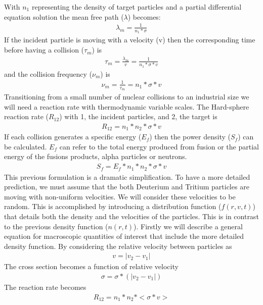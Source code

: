 \documentclass[English]{article}
\begin{document}
With $n_1$ representing the density of target particles and a partial differential equation solution the mean free path ($\lambda$) becomes:
\begin{gather*}\lambda_m = \frac{1}{n_1 * \sigma}\end{gather*}
If the incident particle is moving with a velocity (v) then the corresponding time before having a collision ($\tau_m$) is
\begin{gather*}\tau_m = \frac{\lambda_m}{v}=\frac{1}{n_1 * \sigma * v}\end{gather*}
and the collision frequency ($\nu_m$) is 
\begin{gather*}\nu_m = \frac{1}{\tau_m}=n_1 * \sigma *v\end{gather*}
Transitioning from a small number of nuclear collisions to an industrial size we will need a reaction rate with thermodynamic variable scales. The Hard-sphere reaction rate ($R_{12}$) with 1, the incident particles, and 2, the target is
\begin{gather*}R_{12} = n_1 * n_2 * \sigma * v\end{gather*}
If each collision generates a specific energy ($E_f$) then the power density ($S_f$) can be calculated. $E_f$ can refer to the total energy produced from fusion or the partial energy of the fusions products, alpha particles or neutrons. 
\begin{gather*}S_f = E_f * n_1 * n_2 * \sigma * v\end{gather*}
This previous formulation is a dramatic simplification. To have a more detailed prediction, we must assume that the both Deuterium and Tritium particles are moving with non-uniform velocities. We will consider these velocities to be random. This is accomplished by introducing a distribution function ($f(r,v,t)$) that details both the density and the velocities of the particles. This is in contrast to the previous density function ($n(r,t)$). Firstly we will describe a general equation for macroscopic quantities of interest that include the more detailed density function.
By considering the relative velocity between particles as 
\begin{gather*}v=|v_2-v_1|\end{gather*}
The cross section becomes a function of relative velocity 
\begin{gather*}\sigma=\sigma*(|v_2-v_1|)\end{gather*}
The reaction rate becomes 
\begin{gather*}R_{12}=n_1*n_2 * <\sigma * v>\end{gather*}
\end{document}
